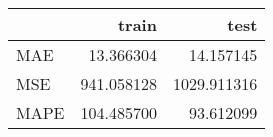 \begin{tabular}{lrr}
\toprule
{} &       train &         test \\
\midrule
MAE  &   13.366304 &    14.157145 \\
MSE  &  941.058128 &  1029.911316 \\
MAPE &  104.485700 &    93.612099 \\
\bottomrule
\end{tabular}
